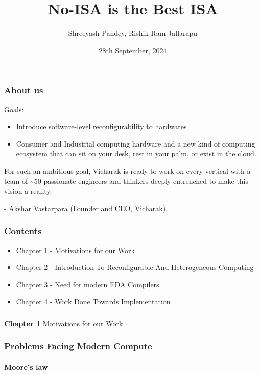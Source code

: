 \documentclass{beamer}
\title{No-ISA is the Best ISA}
\subtitle{}
\author{Shreeyash Pandey, Rishik Ram Jallarapu}
\institute{Vicharak, India @ vicharak.in}
\date{28th September, 2024}
\begin{document}
\begin{frame}
\titlepage
\end{frame}

{

\begin{frame}[fragile]
\frametitle{About us}

  Goals:
  \begin{itemize}
    \item Introduce software-level reconfigurability to hardwares
    \item Consumer and Industrial computing hardware and a new kind of 
      computing ecosystem that can sit on your desk, rest in your palm, or exist in the cloud. 
  \end{itemize}

  For such an ambitious goal, Vicharak is ready to work on every vertical with
  a team of \~{}50 passionate engineers and thinkers deeply entrenched to make this
  vision a reality.

  - Akshar Vastarpara (Founder and CEO, Vicharak)

\framesubtitle{}
\end{frame}

\begin{frame}[fragile]
\frametitle{Contents}

  \begin{itemize}
    \item Chapter 1 - Motivations for our Work
    \item Chapter 2 - Introduction To Reconfigurable And Heterogeneous Computing
    \item Chapter 3 - Need for modern EDA Compilers
    \item Chapter 4 - Work Done Towards Implementation  
  \end{itemize}
\end{frame}

\begin{frame}[c,fragile]
  \frametitle{}
  \centering
  \textbf{Chapter 1}
  \centering
  Motivations for our Work
\end{frame}

\begin{frame}[fragile]
\frametitle{Problems Facing Modern Compute}
  \framesubtitle{Moore's law}


\end{frame}}
\end{document}
